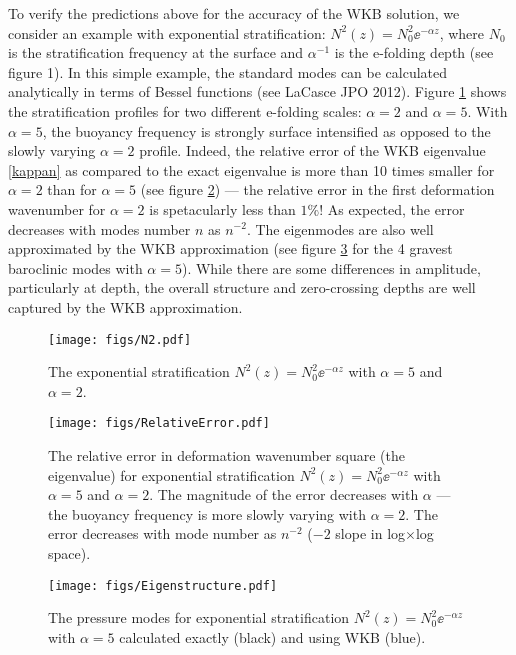 \documentclass[11pt]{article}
\begin{document}
To verify the predictions above for the accuracy of the WKB solution, we consider an example with exponential stratification: $N^2(z) = N_0^2 \ee^{-\alpha z}$,
where $N_0$ is the stratification frequency at the surface and $\alpha^{-1}$ is the e-folding depth (see figure 1). In this simple example,
the standard modes can be calculated analytically in terms of Bessel functions (see LaCasce JPO 2012).
Figure \ref{N2} shows the stratification profiles for two different e-folding scales: $\alpha=2$ and $\alpha=5$. With $\alpha=5$,
the buoyancy frequency is strongly surface intensified as opposed to the slowly varying $\alpha=2$ profile. Indeed, the relative
error of the WKB eigenvalue \eqref{kappan} as compared to the exact eigenvalue is more than 10 times smaller for $\alpha=2$
than for $\alpha=5$ (see figure \ref{rerror}) --- the relative error in the first deformation wavenumber for $\alpha=2$ is spetacularly less than  $1\%$! As expected,
the error decreases with modes number $n$ as $n^{-2}$. The eigenmodes are also well approximated by the WKB approximation (see figure \ref{eigenstructure}
for the 4 gravest baroclinic modes with $\alpha=5$).  While there are some differences in amplitude, particularly at depth, the overall structure and zero-crossing depths
are well captured by the WKB approximation.


\begin{figure}[!ht]
\label{N2}
  \centering
    \texttt{[image: figs/N2.pdf]}
      \caption{The exponential stratification $N^2(z) = N_0^2 \ee^{-\alpha z}$ with $\alpha = 5$ and $\alpha=2$.}
\end{figure}

\begin{figure}[!ht]
\label{rerror}
  \centering
    \texttt{[image: figs/RelativeError.pdf]}
      \caption{The relative error in deformation wavenumber square (the eigenvalue) for exponential stratification $N^2(z) = N_0^2 \ee^{-\alpha z}$ with $\alpha = 5$ and $\alpha=2$. The magnitude of the error decreases with $\alpha$ ---  the buoyancy frequency is more slowly varying with $\alpha=2$.  The error decreases with mode
      number as $n^{-2}$ ($-2$ slope in log$\times$log space).}
\end{figure}

\begin{figure}[!ht]
\label{eigenstructure}
  \centering
    \texttt{[image: figs/Eigenstructure.pdf]}
      \caption{The pressure modes for exponential stratification $N^2(z) = N_0^2 \ee^{-\alpha z}$ with $\alpha = 5$ calculated exactly (black) and using WKB (blue).}
\end{figure}
\end{document}
